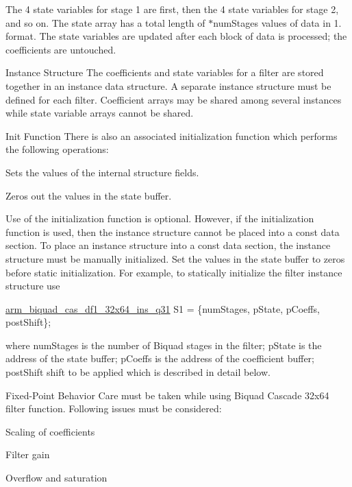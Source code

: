 \begin{DoxyParagraph}{}
The 4 state variables for stage 1 are first, then the 4 state variables for stage 2, and so on. The state array has a total length of {$\ast$num\-Stages} values of data in 1. format. The state variables are updated after each block of data is processed; the coefficients are untouched.
\end{DoxyParagraph}
\begin{DoxyParagraph}{Instance Structure }
The coefficients and state variables for a filter are stored together in an instance data structure. A separate instance structure must be defined for each filter. Coefficient arrays may be shared among several instances while state variable arrays cannot be shared.
\end{DoxyParagraph}
\begin{DoxyParagraph}{Init Function }
There is also an associated initialization function which performs the following operations\-:
\begin{DoxyItemize}
\item Sets the values of the internal structure fields.
\item Zeros out the values in the state buffer. 
\end{DoxyItemize}
\end{DoxyParagraph}
\begin{DoxyParagraph}{}
Use of the initialization function is optional. However, if the initialization function is used, then the instance structure cannot be placed into a const data section. To place an instance structure into a const data section, the instance structure must be manually initialized. Set the values in the state buffer to zeros before static initialization. For example, to statically initialize the filter instance structure use 
\begin{DoxyPre}    
    \hyperlink{structarm__biquad__cas__df1__32x64__ins__q31}{arm\_biquad\_cas\_df1\_32x64\_ins\_q31} S1 = \{numStages, pState, pCoeffs, postShift\};    
\end{DoxyPre}
 where {\ttfamily num\-Stages} is the number of Biquad stages in the filter; {\ttfamily p\-State} is the address of the state buffer; {\ttfamily p\-Coeffs} is the address of the coefficient buffer; {\ttfamily post\-Shift} shift to be applied which is described in detail below. 
\end{DoxyParagraph}
\begin{DoxyParagraph}{Fixed-\/\-Point Behavior }
Care must be taken while using Biquad Cascade 32x64 filter function. Following issues must be considered\-:
\begin{DoxyItemize}
\item Scaling of coefficients
\item Filter gain
\item Overflow and saturation
\end{DoxyItemize}
\end{DoxyParagraph}
